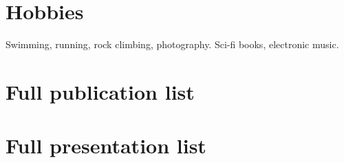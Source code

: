 \section{Hobbies}
Swimming, running, rock climbing, photography. Sci-fi books, electronic music.

\pagebreak
\section{Full publication list}\vspace{0.2cm} 



\pagebreak
\section{Full presentation list}\vspace{0.2cm} 




